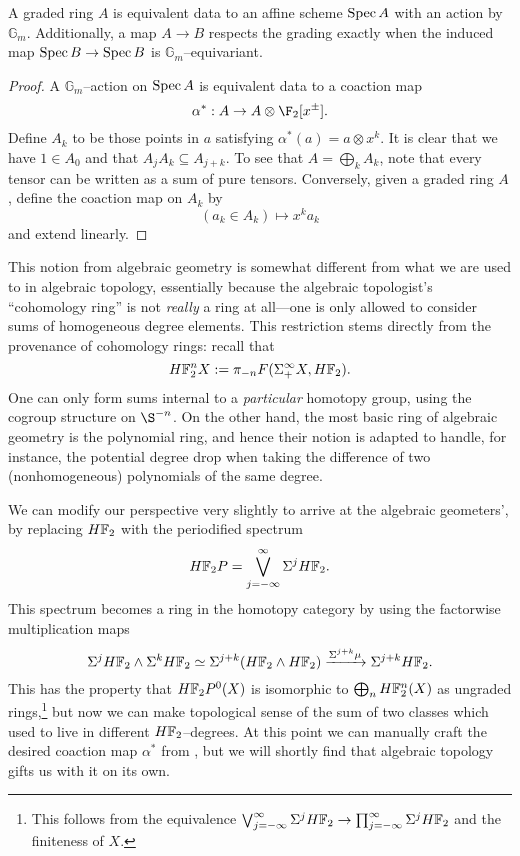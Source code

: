 \begin{lemma}\label{GradedAndGmEquivAgree}
A graded ring \(A\) is equivalent data to an affine scheme \(\operatorname{Spec} A\) with an action by \(\mathbb G_m\).  Additionally, a map \(A \to B\) respects the grading exactly when the induced map \(\operatorname{Spec} B \to \operatorname{Spec} B\) is \(\mathbb G_m\)--equivariant.
\end{lemma}
\begin{proof}
A \(\mathbb G_m\)--action on \(\operatorname{Spec} A\) is equivalent data to a coaction map \[\alpha^*: A \to A \otimes \F_2[x^\pm].\]  Define \(A_k\) to be those points in \(a\) satisfying \(\alpha^*(a) = a \otimes x^k\).  It is clear that we have \(1 \in A_0\) and that \(A_j A_k \subseteq A_{j+k}\).  To see that \(A = \bigoplus_k A_k\), note that every tensor can be written as a sum of pure tensors.  Conversely, given a graded ring \(A\), define the coaction map on \(A_k\) by \[(a_k \in A_k) \mapsto x^k a_k\] and extend linearly.
\end{proof}

This notion from algebraic geometry is somewhat different from what we are used to in algebraic topology, essentially because the algebraic topologist's ``cohomology ring'' is not \emph{really} a ring at all---one is only allowed to consider sums of homogeneous degree elements.  This restriction stems directly from the provenance of cohomology rings: recall that \[\HFtwo^n X := \pi_{-n} F(\Susp^\infty_+ X, \HFtwo).\]  One can only form sums internal to a \emph{particular} homotopy group, using the cogroup structure on \(\S^{-n}\).  On the other hand, the most basic ring of algebraic geometry is the polynomial ring, and hence their notion is adapted to handle, for instance, the potential degree drop when taking the difference of two (nonhomogeneous) polynomials of the same degree.

We can modify our perspective very slightly to arrive at the algebraic geometers', by replacing \(\HFtwo\) with the periodified spectrum \[\HFtwo P = \bigvee_{j=-\infty}^\infty \Susp^j \HFtwo.\]  This spectrum becomes a ring in the homotopy category by using the factorwise multiplication maps \[\Susp^j \HFtwo \sm \Susp^k \HFtwo \simeq \Susp^{j+k} (\HFtwo \sm \HFtwo) \xrightarrow{\Susp^{j+k} \mu} \Susp^{j+k} \HFtwo.\]  This has the property that \(\HFtwo P^0(X)\) is isomorphic to \(\bigoplus_n \HFtwo^n(X)\) as ungraded rings,\footnote{This follows from the equivalence \(\bigvee_{j=-\infty}^\infty \Susp^j \HFtwo \to \prod_{j=-\infty}^\infty \Susp^j \HFtwo\) and the finiteness of \(X\).} but now we can make topological sense of the sum of two classes which used to live in different \(\HFtwo\)--degrees.  At this point we can manually craft the desired coaction map \(\alpha^*\) from , but we will shortly find that algebraic topology gifts us with it on its own.

